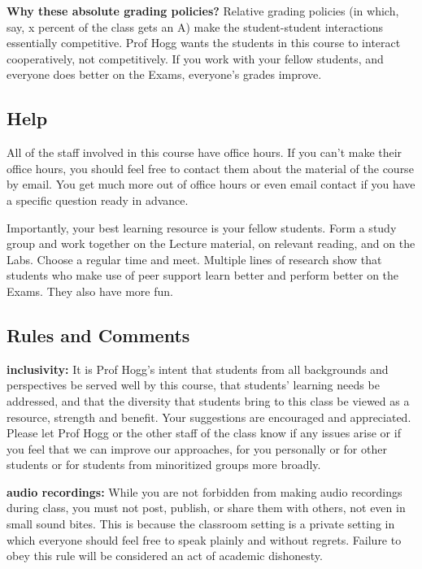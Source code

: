 \documentclass[12pt, letterpaper]{article}
\renewcommand{\paragraph}[1]{\par\smallskip\noindent\textbf{#1}}
\begin{document}
\textbf{Why these absolute grading policies?} Relative grading
policies (in which, say, x percent of the class gets an A) make the
student-student interactions essentially competitive. Prof Hogg wants
the students in this course to interact cooperatively, not
competitively. If you work with your fellow students, and everyone
does better on the Exams, everyone's grades improve.

\subsection*{Help}

All of the staff involved in this course have office hours.
If you can't make their office hours, you should feel free
to contact them about the material of the course by email. You get
much more out of office hours or even email contact if you have a
specific question ready in advance.

Importantly, your best learning resource is your fellow students.
Form a study group and work together on the Lecture material, on
relevant reading, and on the Labs.
Choose a regular time and meet.
Multiple lines of research show that students who make use of peer
support learn better and perform better on the Exams.
They also have more fun.

\subsection*{Rules and Comments}

\paragraph{inclusivity:}
It is Prof Hogg's intent that students from all backgrounds and
perspectives be served well by this course, that students' learning
needs be addressed, and that the diversity that students bring to this
class be viewed as a resource, strength and benefit. Your suggestions
are encouraged and appreciated. Please let Prof Hogg or the other
staff of the class know if any issues arise or if you feel that we can improve our
approaches, for you personally or for other students or for students
from minoritized groups more broadly.

\paragraph{audio recordings:}
While you are not forbidden from making audio recordings during class,
you must not post, publish, or share them with others, not even in
small sound bites. This is because the classroom setting is a private
setting in which everyone should feel free to speak plainly and
without regrets. Failure to obey this rule will be considered an act
of academic dishonesty.
\end{document}
